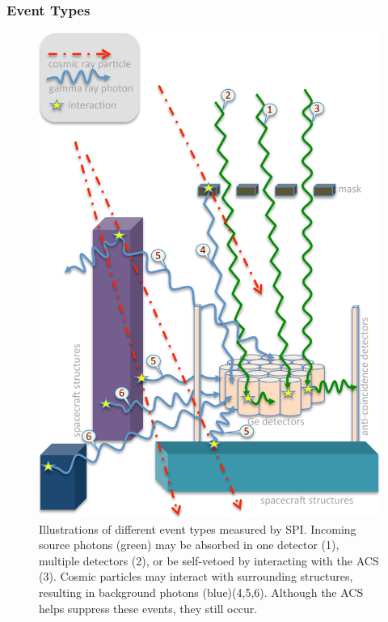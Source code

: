 \documentclass{report}
\begin{document}
\subsubsection*{Event Types}
\begin{figure}
  \vspace{-20pt}
  \includegraphics[width=\linewidth]{Images/General/SPI_event_types_roland_2017.PNG}
  \caption{Illustrations of different event types measured by SPI. Incoming source photons (green) may be absorbed in one detector (1), multiple detectors (2), or be self-vetoed by interacting with the ACS (3). Cosmic particles may interact with surrounding structures, resulting in background photons (blue)(4,5,6). Although the ACS helps suppress these events, they still occur. \cite{refId2}}
  \vspace{-50pt}
  \label{event_types}
\end{figure}
\end{document}
